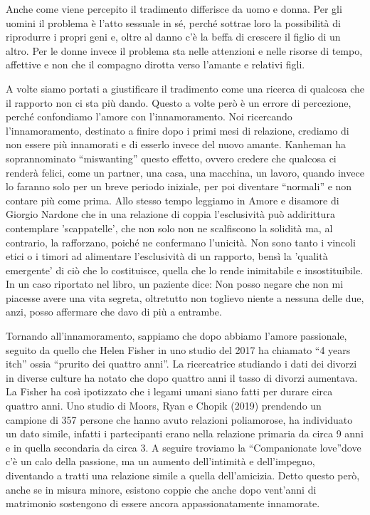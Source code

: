\documentclass[12pt]{book} %
\begin{document}
Anche come viene percepito il tradimento differisce da uomo e donna. Per gli uomini il problema è
l'atto sessuale in sé, perché sottrae loro la possibilità di riprodurre i propri geni e, oltre al
danno c'è la beffa di crescere il figlio di un altro. Per le donne invece il problema sta nelle
attenzioni e nelle risorse di tempo, affettive e non che il compagno dirotta verso l'amante e
relativi figli. 

A volte siamo portati a giustificare il tradimento come una ricerca di qualcosa che il rapporto non ci sta più dando.
Questo a volte però è un errore di percezione, perché confondiamo l'amore con
l'innamoramento. Noi ricercando l'innamoramento, destinato a finire dopo i
primi mesi di relazione, crediamo di non essere più innamorati e di esserlo invece del nuovo amante. 
Kanheman ha soprannominato “miswanting” questo effetto, ovvero credere che qualcosa ci renderà felici, come un partner,
una casa, una macchina, un lavoro, quando invece lo faranno solo per un breve periodo iniziale, per poi
diventare “normali” e non contare più come prima. 
Allo stesso tempo leggiamo in Amore e disamore di Giorgio Nardone che
in una relazione di coppia l'esclusività può addirittura contemplare
'scappatelle', che non solo non ne scalfiscono la solidità ma, al contrario,
la rafforzano, poiché ne confermano l'unicità.
Non sono tanto i vincoli etici o i timori ad alimentare l'esclusività di un rapporto, bensì la
'qualità emergente' di ciò che lo costituisce, quella che lo rende
inimitabile e insostituibile. In un caso riportato nel libro, un paziente dice: Non posso negare che non mi piacesse
avere una vita segreta, oltretutto non toglievo niente a nessuna delle due, anzi, posso affermare che davo di più a entrambe.

Tornando all'innamoramento, sappiamo che dopo abbiamo l'amore passionale, seguito da quello che
Helen Fisher in uno studio del 2017 ha chiamato “4 years itch” ossia “prurito dei quattro anni”. La ricercatrice
studiando i dati dei divorzi in diverse culture ha notato che dopo quattro anni il tasso di divorzi aumentava. La
Fisher ha così ipotizzato che i legami umani siano fatti per durare circa quattro anni. Uno studio
di Moors, Ryan e Chopik (2019) prendendo un campione di 357 persone che hanno avuto relazioni poliamorose, ha
individuato un dato simile, infatti i partecipanti erano nella relazione primaria da circa 9 anni e in quella
secondaria da circa 3. A seguire troviamo la “Companionate love”dove c'è un calo della passione,
ma un aumento dell'intimità e dell'impegno, diventando a tratti una relazione
simile a quella dell'amicizia. Detto questo però, anche se in misura minore, esistono
coppie che anche dopo vent'anni di matrimonio sostengono di essere ancora appassionatamente
innamorate. 
\end{document}
